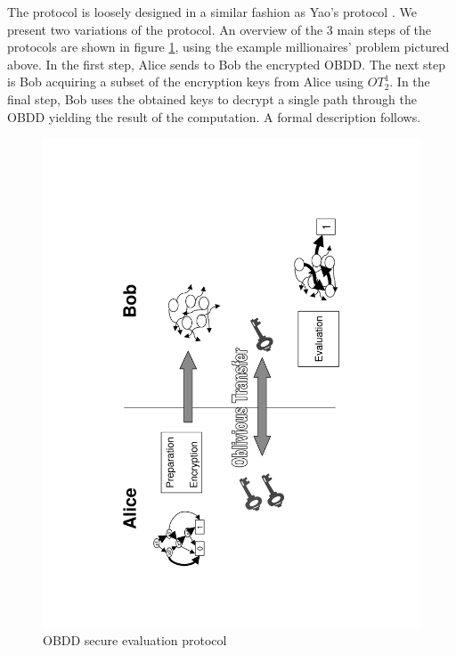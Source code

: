 The protocol is loosely designed in a similar fashion as Yao's protocol
\cite{Yao86}. We present two variations of the protocol. An overview
of the 3 main steps of the protocols are shown in figure \ref{fig:OBDD-overview},
using the example millionaires' problem pictured above. In the first
step, Alice sends to Bob the encrypted OBDD. The next step is Bob
acquiring a subset of the encryption keys from Alice using $OT_{2}^{1}$.
In the final step, Bob uses the obtained keys to decrypt a single
path through the OBDD yielding the result of the computation. A formal
description follows. 

%
\begin{figure}
\begin{centering}
\includegraphics[scale=0.4,angle=270]{obdd_proto_overview}
\par\end{centering}

\caption{\label{fig:OBDD-overview}OBDD secure evaluation protocol}

\end{figure}


